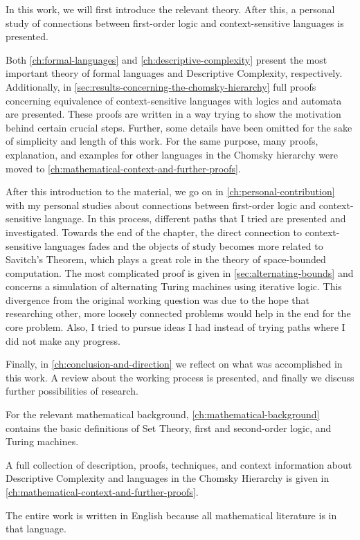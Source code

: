 In this work, we will first introduce the relevant theory.
After this, a personal study of connections between first-order logic and context-sensitive languages is presented.

Both \cref{ch:formal-languages} and \cref{ch:descriptive-complexity} present the most important theory of formal languages and Descriptive Complexity, respectively.
Additionally, in \cref{sec:results-concerning-the-chomsky-hierarchy} full proofs concerning equivalence of context-sensitive languages with logics and automata are presented.
These proofs are written in a way trying to show the motivation behind certain crucial steps.
Further, some details have been omitted for the sake of simplicity and length of this work.
For the same purpose, many proofs, explanation, and examples for other languages in the Chomsky hierarchy were moved to \cref{ch:mathematical-context-and-further-proofs}.

After this introduction to the material, we go on in \cref{ch:personal-contribution} with my personal studies about connections between first-order logic and context-sensitive language.
In this process, different paths that I tried are presented and investigated.
Towards the end of the chapter, the direct connection to context-sensitive languages fades and the objects of study becomes more related to Savitch's Theorem, which plays a great role in the theory of space-bounded computation.
The most complicated proof is given in \cref{sec:alternating-bounds} and concerns a simulation of alternating Turing machines using iterative logic.
This divergence from the original working question was due to the hope that researching other, more loosely connected problems would help in the end for the core problem.
Also, I tried to pursue ideas I had instead of trying paths where I did not make any progress.

Finally, in \cref{ch:conclusion-and-direction} we reflect on what was accomplished in this work.
A review about the working process is presented, and finally we discuss further possibilities of research.

For the relevant mathematical background, \cref{ch:mathematical-background} contains the basic definitions of Set Theory, first and second-order logic, and Turing machines.

A full collection of description, proofs, techniques, and context information about Descriptive Complexity and languages in the Chomsky Hierarchy is given in \cref{ch:mathematical-context-and-further-proofs}.

The entire work is written in English because all mathematical literature is in that language.